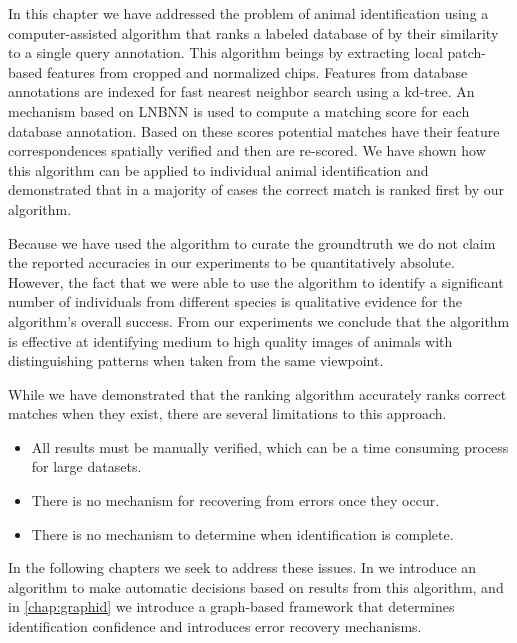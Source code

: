     In this chapter we have addressed the problem of animal identification
      using a computer-assisted algorithm that ranks a labeled database of
      \names{} by their similarity to a single query annotation.
    This algorithm beings by extracting local patch-based features from
      cropped and normalized chips.
    Features from database annotations are indexed for fast nearest neighbor
      search using a kd-tree.
    An mechanism based on LNBNN is used to compute a matching score for each
      database annotation.
    Based on these scores potential matches have their feature correspondences
      spatially verified and then are re-scored.
    We have shown how this algorithm can be applied to individual animal
      identification and demonstrated that in a majority of cases the correct
      match is ranked first by our algorithm.


    Because we have used the algorithm to curate the groundtruth we do
      not claim the reported accuracies in our experiments to be
      quantitatively absolute.
    However, the fact that we were able to use the algorithm to
      identify a significant number of individuals from different species
      is qualitative evidence for the algorithm's overall success.
    From our experiments we conclude that the algorithm is effective at
      identifying medium to high quality images of animals with
      distinguishing patterns when taken from the same viewpoint.

    While we have demonstrated that the ranking algorithm accurately ranks
      correct matches when they exist, there are several limitations to this
      approach.
    \begin{itemize}
        \item All results must be manually verified, which can be a time
          consuming process for large datasets.
        \item There is no mechanism for recovering from errors once they
          occur.
        \item There is no mechanism to determine when identification is
          complete.
    \end{itemize}
    In the following chapters we seek to address these issues.
    In  we introduce an algorithm to make automatic
      decisions based on results from this algorithm, and in \cref{chap:graphid}
      we introduce a graph-based framework that determines identification
      confidence and introduces error recovery mechanisms.



